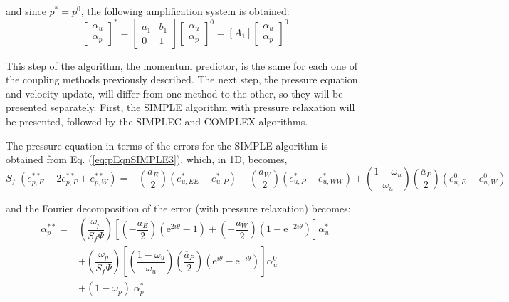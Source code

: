\documentclass[final,3p,times,11pt,onecolumn]{myElsarticle}
\numberwithin{equation}{section}
\begin{document}
\noindent and since $p^* = p^0$, the following amplification system is obtained:
\begin{equation}
\begin{bmatrix}
\alpha_u \\
\alpha_p 
\end{bmatrix}^{*} =
\begin{bmatrix}
a_1 & b_1 \\
0 & 1
\end{bmatrix}
\begin{bmatrix}
\alpha_u \\
\alpha_p 
\end{bmatrix}^{0} =
[A_1]
\begin{bmatrix}
\alpha_u \\
\alpha_p 
\end{bmatrix}^{0}
\end{equation}

This step of the algorithm, the momentum predictor, is the same for each one of the coupling methods previously described. The next step, the pressure equation and velocity update, will differ from one method to the other, so they will be presented separately. First, the SIMPLE algorithm with pressure relaxation will be presented, followed by the SIMPLEC and COMPLEX algorithms.

The pressure equation in terms of the errors for the SIMPLE algorithm is obtained from Eq. (\ref{eq:pEqnSIMPLE3}), which, in 1D, becomes,
\begin{equation}
    S_f \; (e_{p,E}^{**} - 2 e_{p,P}^{**} + e_{p,W}^{**}) = 
     -\left(\dfrac{a_E}{2}\right) (e_{u,EE}^* - e_{u,P}^*) 
    -\left(\dfrac{a_W}{2}\right) (e_{u,P}^* - e_{u,WW}^*)  +
    \left( \dfrac{1-\omega_u}{\omega_u} \right) \left(\dfrac{\overline{a}_P}{2}\right) (e_{u,E}^0 - e_{u,W}^0)
\end{equation}

\noindent and the Fourier decomposition of the error (with pressure relaxation) becomes:
\begin{equation}
\begin{split}
    \alpha_p^{**} = &\left( \dfrac{\omega_p}{S_f \Psi} \right) 
                    \left[ \left(-\dfrac{a_E}{2} \right) \left(\text{e}^{2 i \theta} - 1 \right) +
                            \left(-\dfrac{a_W}{2} \right) \left(1 - \text{e}^{-2 i \theta}\right)
                    \right] \alpha_u^{*} \\
                    & + \left( \dfrac{\omega_p}{S_f \Psi} \right) 
                    \left[ \left(\dfrac{1-\omega_u}{\omega_u} \right) \left(\dfrac{\overline{a}_P}{2} \right) \left(\text{e}^{i \theta} - \text{e}^{- i \theta} \right) 
                    \right] \alpha_u^{0} \\
                    & + (1-\omega_p) \; \alpha_p^*    
\end{split}
\end{equation}
\end{document}
